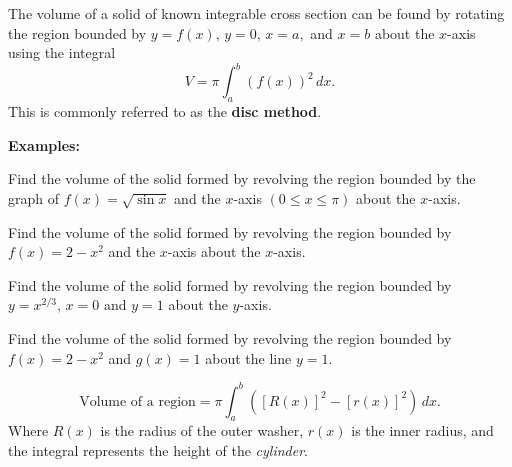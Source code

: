 \documentclass[addpoints, 12pt]{exam}
\begin{document}
\begin{tcolorbox}[title= VOLUME OF A SOLID OF REVOLUTION, black,sharp corners,colback=white,colbacktitle=white,coltitle=black,boxrule=1pt]

     The volume of a solid of known integrable cross section can be found by rotating the region bounded by $y=f(x),\,y=0,\,x=a,$ and $x=b$ about the $x$-axis using the integral
     \[V=\pi\int_a^b\left(f(x)\right)^2\,dx.\]
     This is commonly referred to as the \textbf{disc method}.
    
\end{tcolorbox}
\textbf{Examples:}
\begin{questions}
    \question Find the volume of the solid formed by revolving the region bounded by the graph of $f(x)=\sqrt{\sin x}$ and the $x$-axis $\left(0\le x\le\pi\right)$ about the $x$-axis.
    
    \question Find the volume of the solid formed by revolving the region bounded by $f(x)=2-x^2$ and the $x$-axis about the $x$-axis.
    
    \question Find the volume of the solid formed by revolving the region bounded by $y=x^{2/3},\, x=0$ and $y=1$ about the $y$-axis.
    
    \newpage
    
    \question Find the volume of the solid formed by revolving the region bounded by $f(x)=2-x^2$ and $g(x)=1$ about the line $y=1$.

\end{questions}

\begin{tcolorbox}[title= VOLUME OF A REGION USING WASHERS, black,sharp corners,colback=white,colbacktitle=white,coltitle=black,boxrule=1pt]

     \[\text{Volume of a region}=\pi\int_a^b\left(\left[R(x)\right]^2-\left[r(x)\right]^2\right)\,dx.\]
     Where $R(x)$ is the radius of the outer washer, $r(x)$ is the inner radius, and the integral represents the height of the \textit{cylinder}.
    
\end{tcolorbox}
\end{document}
